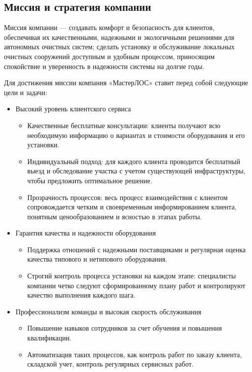 \documentclass[a4paper,12pt]{article}
\begin{document}
\subsection{Миссия и стратегия компании}
Миссия компании --- создавать комфорт и безопасность для клиентов, обеспечивая их качественными, надежными и экологичными решениями для автономных очистных систем; сделать установку и обслуживание локальных очистных сооружений доступным и удобным процессом, приносящим спокойствие и уверенность в надежности системы на долгие годы.

Для достижения миссии компания «МастерЛОС» ставит перед собой следующие цели и задачи:
\begin{itemize}
    \item Высокий уровень клиентского сервиса
    \begin{itemize}
        \item Качественные бесплатные консультации: клиенты получают всю необходимую информацию о вариантах и стоимости оборудования и его установки.
        \item Индивидуальный подход: для каждого клиента проводится бесплатный выезд и обследование участка с учетом существующей инфраструктуры, чтобы предложить оптимальное решение.
        \item Прозрачность процессов: весь процесс взаимодействия с клиентом сопровождается четким и своевременным информированием клиента, понятным ценообразованием и ясностью в этапах работы.
    \end{itemize}
    \item Гарантия качества и надежности оборудования
    \begin{itemize}
    \item Поддержка отношений с надежными поставщиками и регулярная оценка качества типового и нетипового оборудования.
    \item Строгий контроль процесса установки на каждом этапе: специалисты компании четко следуют сформированному плану работ и контролируют качество выполнения каждого шага.
    \end{itemize}
    \item Профессионализм команды и высокая скорость обслуживания
    \begin{itemize}
        \item Повышение навыков сотрудников за счет обучения и повышения квалификации.
        \item Автоматизация таких процессов, как контроль работ по заказу клиента, складской учет, контроль регулярных сервисных работ.

\end{itemize}
\end{itemize}
\end{document}
